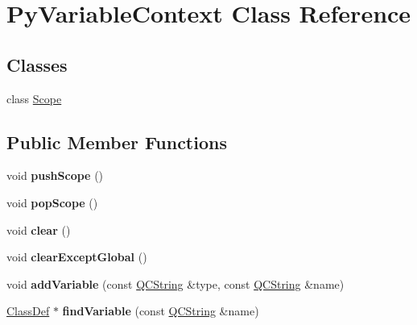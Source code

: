 \hypertarget{class_py_variable_context}{}\section{Py\+Variable\+Context Class Reference}
\label{class_py_variable_context}
\subsection*{Classes}
\begin{DoxyCompactItemize}
\item 
class \mbox{\hyperlink{class_py_variable_context_1_1_scope}{Scope}}
\end{DoxyCompactItemize}
\subsection*{Public Member Functions}
\begin{DoxyCompactItemize}
\item 
\mbox{\label{class_py_variable_context_a0546bb3cb235db78d2e8fcbb1dcb6502}} 
void {\bfseries push\+Scope} ()
\item 
\mbox{\label{class_py_variable_context_ae24b90d1862e5ea27664f1d5adbf215a}} 
void {\bfseries pop\+Scope} ()
\item 
\mbox{\label{class_py_variable_context_adba488d880f24fee22111357a13c2d4f}} 
void {\bfseries clear} ()
\item 
\mbox{\label{class_py_variable_context_aa324279947b58bc2b6fe6566a5413988}} 
void {\bfseries clear\+Except\+Global} ()
\item 
\mbox{\label{class_py_variable_context_a0aeecbdf9dfc4ac3e3680e48531e4300}} 
void {\bfseries add\+Variable} (const \mbox{\hyperlink{class_q_c_string}{Q\+C\+String}} \&type, const \mbox{\hyperlink{class_q_c_string}{Q\+C\+String}} \&name)
\item 
\mbox{\label{class_py_variable_context_a9fc4eb25a82e2566d2b6bdab62fbd5d7}} 
\mbox{\hyperlink{class_class_def}{Class\+Def}} $\ast$ {\bfseries find\+Variable} (const \mbox{\hyperlink{class_q_c_string}{Q\+C\+String}} \&name)
\end{DoxyCompactItemize}
